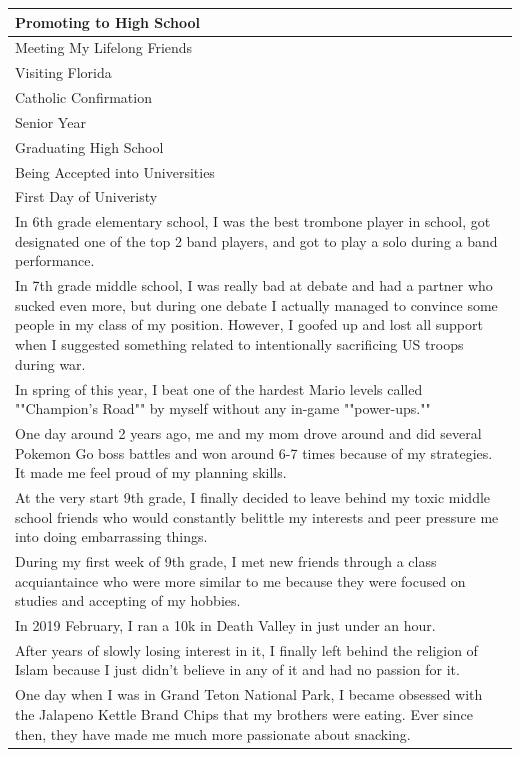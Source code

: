 \documentclass[
  .7em,
  letterpaper,
  DIV=11,
  numbers=noendperiod]{scrartcl}
\begin{document}
\begin{table}
\begin{tabular}{l}
\hline
Promoting to High School\\
\hline
Meeting My Lifelong Friends\\
\hline
Visiting Florida\\
\hline
Catholic Confirmation\\
\hline
Senior Year\\
\hline
Graduating High School\\
\hline
Being Accepted into Universities\\
\hline
First Day of Univeristy\\
\hline
In 6th grade elementary school, I was the best trombone player in school, got designated one of the top 2 band players, and got to play a solo during a band performance.\\
\hline
In 7th grade middle school, I was really bad at debate and had a partner who sucked even more, but during one debate I actually managed to convince some people in my class of my position. However, I goofed up and lost all support when I suggested something related to intentionally sacrificing US troops during war.\\
\hline
In spring of this year, I beat one of the hardest Mario levels called ""Champion's Road"" by myself without any in-game ""power-ups.""\\
\hline
One day around 2 years ago, me and my mom drove around and did several Pokemon Go boss battles and won around 6-7 times because of my strategies. It made me feel proud of my planning skills.\\
\hline
At the very start 9th grade, I finally decided to leave behind my toxic middle school friends who would constantly belittle my interests and peer pressure me into doing embarrassing things.\\
\hline
During my first week of 9th grade, I met new friends through a class acquiantaince who were more similar to me because they were focused on studies and accepting of my hobbies.\\
\hline
In 2019 February, I ran a 10k in Death Valley in just under an hour.\\
\hline
After years of slowly losing interest in it, I finally left behind the religion of Islam because I just didn't believe in any of it and had no passion for it.\\
\hline
One day when I was in Grand Teton National Park, I became obsessed with the Jalapeno Kettle Brand Chips that my brothers were eating. Ever since then, they have made me much more passionate about snacking.\\

\end{tabular}
\end{table}
\end{document}
